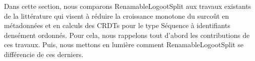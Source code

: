 Dans cette section, nous comparons RenamableLogootSplit aux travaux existants de la littérature qui visent à réduire la croissance monotone du surcoût en métadonnées et en calculs des \acp{CRDT} pour le type Séquence à identifiants densément ordonnés.
Pour cela, nous rappelons tout d'abord les contributions de ces travaux.
Puis, nous mettons en lumière comment RenamableLogootSplit se différencie de ces derniers.
